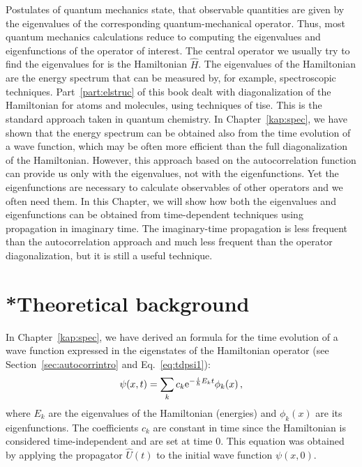Postulates of quantum mechanics state, that observable quantities are given by the eigenvalues of the corresponding quantum-mechanical operator. Thus, most quantum mechanics calculations reduce to computing the eigenvalues and eigenfunctions of the operator of interest. The central operator we usually try to find the eigenvalues for is the Hamiltonian $\hat{H}$. The eigenvalues of the Hamiltonian are the energy spectrum that can be measured by, for example, spectroscopic techniques. Part~\ref{part:elstruc} of this book dealt with diagonalization of the Hamiltonian for atoms and molecules, using techniques of \acrfull{tise}. This is the standard approach taken in quantum chemistry. In Chapter~\ref{kap:spec}, we have shown that the energy spectrum can be obtained also from the time evolution of a wave function, which may be often more efficient than the full diagonalization of the Hamiltonian. However, this approach based on the autocorrelation function can provide us only with the eigenvalues, not with the eigenfunctions. Yet the eigenfunctions are necessary to calculate observables of other operators and we often need them. In this Chapter, we will show how both the eigenvalues and eigenfunctions can be obtained from time-dependent techniques using propagation in imaginary time. The imaginary-time propagation is less frequent than the autocorrelation approach and much less frequent than the operator diagonalization, but it is still a useful technique.

\section{*Theoretical background}

In Chapter~\ref{kap:spec}, we have derived an formula for the time evolution of a wave function expressed in the eigenstates of the Hamiltonian operator (see Section~\ref{sec:autocorrintro} and Eq.~\eqref{eq:tdpsi1}):
\begin{equation}
    \psi(x,t) = \sum_k c_k \mathrm{e}^{-\frac{i}{\hbar}E_k t}\phi_k(x) \, ,
    \label{eq:tdpsi2}
\end{equation}
where $E_k$ are the eigenvalues of the Hamiltonian (energies) and $\phi_k(x)$ are its eigenfunctions. The coefficients $c_k$ are constant in time since the Hamiltonian is considered time-independent and are set at time 0. This equation was obtained by applying the propagator $\hat{U}(t)$ to the initial wave function $\psi(x,0)$. 

